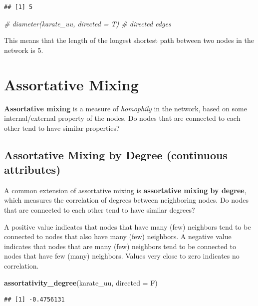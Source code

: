 \documentclass[
]{book}
\newenvironment{Shaded}{\begin{snugshade}}{\end{snugshade}}
\newcommand{\AttributeTok}[1]{\textcolor[rgb]{0.13,0.29,0.53}{#1}}
\newcommand{\CommentTok}[1]{\textcolor[rgb]{0.56,0.35,0.01}{\textit{#1}}}
\newcommand{\FunctionTok}[1]{\textcolor[rgb]{0.13,0.29,0.53}{\textbf{#1}}}
\newcommand{\NormalTok}[1]{#1}
\begin{document}
\begin{verbatim}
## [1] 5
\end{verbatim}

\begin{Shaded}
\begin{Highlighting}[]
\CommentTok{\# diameter(karate\_uu, directed = T) \# directed edges }
\end{Highlighting}
\end{Shaded}

This means that the length of the longest shortest path between two nodes in the network is 5.

\section{Assortative Mixing}\label{assortative-mixing}

\textbf{Assortative mixing} is a measure of \emph{homophily} in the network, based on some internal/external property of the nodes. Do nodes that are connected to each other tend to have similar properties?

\subsection{Assortative Mixing by Degree (continuous attributes)}\label{assortative-mixing-by-degree-continuous-attributes}

A common extension of assortative mixing is \textbf{assortative mixing by degree}, which measures the correlation of degrees between neighboring nodes. Do nodes that are connected to each other tend to have similar degrees?

A positive value indicates that nodes that have many (few) neighbors tend to be connected to nodes that also have many (few) neighbors. A negative value indicates that nodes that are many (few) neighbors tend to be connected to nodes that have few (many) neighbors. Values very close to zero indicates no correlation.

\begin{Shaded}
\begin{Highlighting}[]
\FunctionTok{assortativity\_degree}\NormalTok{(karate\_uu, }\AttributeTok{directed =}\NormalTok{ F)}
\end{Highlighting}
\end{Shaded}

\begin{verbatim}
## [1] -0.4756131
\end{verbatim}
\end{document}
